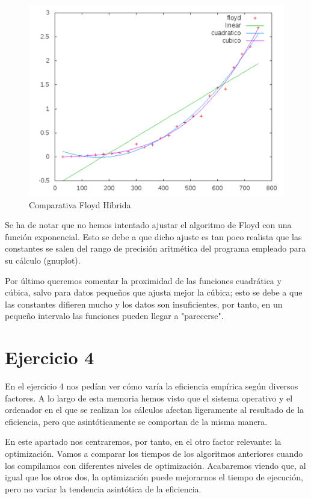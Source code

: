 \documentclass[a4paper, 11pt]{article}
\begin{document}
\begin{figure}[H]\includegraphics[width=13cm]{img/floyd_hibrida.pdf} \centering
	\caption{Comparativa Floyd Híbrida}\end{figure}

Se ha de notar que no hemos intentado ajustar el algoritmo de Floyd con una función exponencial. Esto se debe a que dicho ajuste es tan poco realista que las constantes se salen del rango de precisión aritmética del programa empleado para su cálculo (gnuplot).


Por último queremos comentar la proximidad de las funciones cuadrática y cúbica, salvo para datos pequeños que ajusta mejor la cúbica; esto se debe a que las constantes difieren mucho y los datos son insuficientes, por tanto, en un pequeño intervalo las funciones pueden llegar a "parecerse".

\newpage
\section{Ejercicio 4}

En el ejercicio 4 nos pedían ver cómo varía la eficiencia empírica según diversos factores. A lo largo de esta memoria hemos visto que el sistema operativo y el ordenador en el que se realizan los cálculos afectan ligeramente al resultado de la eficiencia, pero que asintóticamente se comportan de la misma manera.

En este apartado nos centraremos, por tanto, en el otro factor relevante: la optimización. Vamos a comparar los tiempos de los algoritmos anteriores cuando los compilamos con diferentes niveles de optimización. Acabaremos viendo que, al igual que los otros dos, la optimización puede mejorarnos el tiempo de ejecución, pero no variar la tendencia asintótica de la eficiencia.
\end{document}
